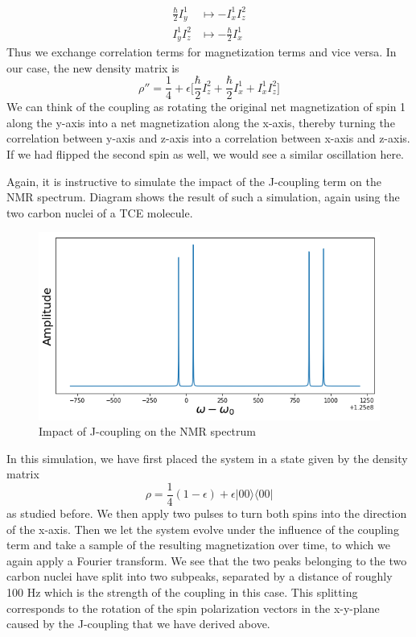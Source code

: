 \documentclass[a4paper, draft]{article}
\theoremstyle{own}
\theoremstyle{remark}
\begin{document}
\begin{align*}
\frac{\hbar}{2} I_y^1 &\mapsto - I_x^1 I_z^2 \\
I_y^1 I_z^2  &\mapsto - \frac{\hbar}{2} I_x^1
\end{align*}
Thus we exchange correlation terms for magnetization terms and vice versa. In our case, the new density matrix is
$$
\rho'' = \frac{1}{4} + \epsilon \big[  \frac{\hbar}{2} I_z^2   
+ \frac{\hbar}{2} I_x^1  + I_x^1 I_z^2 \big]
$$
We can think of the coupling as rotating the original net magnetization of spin 1 along the y-axis into a net magnetization along the x-axis, thereby turning the correlation between y-axis and z-axis into a correlation between x-axis and z-axis. If we had flipped the second spin as well, we would see a similar oscillation here.

Again, it is instructive to simulate the impact of the J-coupling term on the NMR spectrum. Diagram shows the result of such a simulation, again using the two carbon nuclei of a TCE molecule.

\begin{figure}[ht]
\centering
\includegraphics[width=0.9\linewidth]{images/TwoCoupledNucleiNMRSignalFFT}
\caption[Impact of J-coupling on the NMR spectrum]{Impact of J-coupling on the NMR spectrum}
\label{fig:TwoCoupledNucleiNMRSignalFFT}
\end{figure}


In this simulation, we have first placed the system in a state given by the density matrix
$$
\rho = \frac{1}{4} (1 - \epsilon) + \epsilon |00 \rangle \langle 00 |
$$
as studied before. We then apply two pulses to turn both spins into the direction of the x-axis. Then we let the system evolve under the influence of the coupling term and take a sample of the resulting magnetization over time, to which we again apply a Fourier transform. We see that the two peaks belonging to the two carbon nuclei have split into two subpeaks, separated by a distance of roughly 100 Hz which is the strength of the coupling in this case. This splitting corresponds to the rotation of the spin polarization vectors in the x-y-plane caused by the J-coupling that we have derived above.
\end{document}
